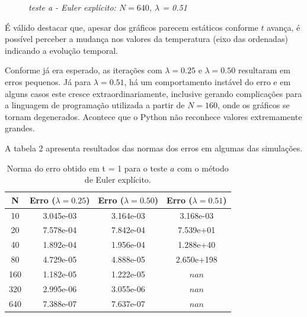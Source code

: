 \documentclass[a4paper, 12pt]{article}
\begin{document}
\begin{figure}[H]
    \caption{\textit{teste a - Euler explícito: $N = 640$, $\lambda$ = 0.51}}
\end{figure}

É válido destacar que, apesar dos gráficos parecem estáticos conforme $t$ avança, é possível perceber a mudança nos valores da temperatura (eixo das ordenadas) indicando a evolução temporal.

Conforme já era esperado, as iterações com $\lambda = 0.25$ e $\lambda = 0.50$ resultaram em erros pequenos. Já para $\lambda = 0.51$, há um comportamento instável do erro e em alguns casos este cresce extraordinariamente, inclusive gerando complicações para a linguagem de programação utilizada a partir de $N=160$, onde os gráficos se tornam degenerados. Acontece que o Python não reconhece valores extremamente grandes. 

A tabela 2 apresenta resultados das normas dos erros em algumas das simulações.

\begin{table}[!h]
    \centering
    \begin{tabular}{|c|c|c|c|}
    \hline                               %
    N & Erro ($\lambda = 0.25$) & Erro ($\lambda = 0.50$) & Erro ($\lambda = 0.51$) \\
    \hline
    10  &  3.045e-03 & 3.164e-03 & 3.168e-03 \\
    20  &  7.578e-04 & 7.842e-04 & 7.539e+01 \\
    40  &  1.892e-04 & 1.956e-04 & 1.288e+40 \\
    80  &  4.729e-05 & 4.888e-05 & 2.650e+198 \\
    160 &  1.182e-05 & 1.222e-05 & $nan$ \\
    320 &  2.995e-06 & 3.055e-06 & $nan$ \\
    640 &  7.388e-07 & 7.637e-07 & $nan$ \\
    \hline
    \end{tabular}
    \caption{Norma do erro obtido em t = 1 para o teste $a$ com o método de Euler explícito.}
\end{table}
\end{document}
